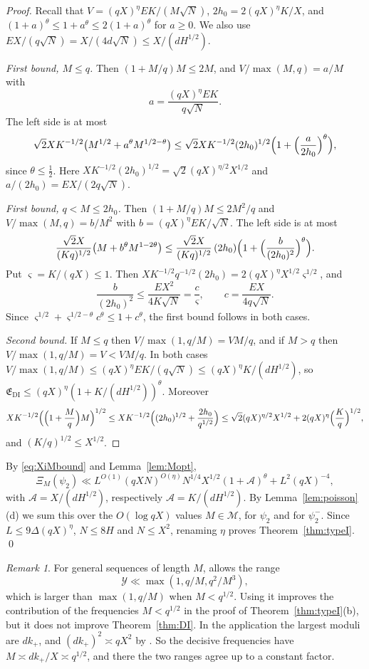 \documentclass[11pt]{amsart}
\theoremstyle{remark}
\newtheorem{remark}[theorem]{Remark}
\theoremstyle{definition}
\numberwithin{equation}{section}
\newcommand{\Mset}{\mathcal{M}}
\begin{document}
\begin{proof}
Recall that $V=(qX)^\eta EK/(M\sqrt N)$, $2h_0=2(qX)^\eta K/X$, and $(1+a)^\theta\le1+a^\theta\le2(1+a)^\theta$ for $a\ge0$. We also use $EX/(q\sqrt N)=X/(4d\sqrt N)\le X/(dH^{1/2})$.

\emph{First bound, $M\le q$.} Then $(1+M/q)M\le2M$, and $V/\max(M,q)=a/M$ with
\[
a=\frac{(qX)^\eta EK}{q\sqrt N}.
\]
The left side is at most
\[
\sqrt2XK^{-1/2}\bigl(M^{1/2}+a^\theta M^{1/2-\theta}\bigr)\le\sqrt2XK^{-1/2}(2h_0)^{1/2}\Bigl(1+\Bigl(\frac a{2h_0}\Bigr)^\theta\Bigr),
\]
since $\theta\le\frac12$. Here $XK^{-1/2}(2h_0)^{1/2}=\sqrt2(qX)^{\eta/2}X^{1/2}$ and $a/(2h_0)=EX/(2q\sqrt N)$.

\emph{First bound, $q<M\le2h_0$.} Then $(1+M/q)M\le2M^2/q$ and $V/\max(M,q)=b/M^2$ with $b=(qX)^\eta EK/\sqrt N$. The left side is at most
\[
\frac{\sqrt2X}{(Kq)^{1/2}}\bigl(M+b^\theta M^{1-2\theta}\bigr)\le\frac{\sqrt2X}{(Kq)^{1/2}}\,(2h_0)\Bigl(1+\Bigl(\frac b{(2h_0)^2}\Bigr)^\theta\Bigr).
\]
Put $\varsigma=K/(qX)\le1$. Then $XK^{-1/2}q^{-1/2}(2h_0)=2(qX)^\eta X^{1/2}\varsigma^{1/2}$, and
\[
\frac b{(2h_0)^2}\le\frac{EX^2}{4K\sqrt N}=\frac{c}{\varsigma},\qquad c=\frac{EX}{4q\sqrt N}.
\]
Since $\varsigma^{1/2}+\varsigma^{1/2-\theta}c^\theta\le1+c^\theta$, the first bound follows in both cases.

\emph{Second bound.} If $M\le q$ then $V/\max(1,q/M)=VM/q$, and if $M>q$ then $V/\max(1,q/M)=V<VM/q$. In both cases $V/\max(1,q/M)\le(qX)^\eta EK/(q\sqrt N)\le(qX)^\eta K/(dH^{1/2})$, so $\mathfrak E_{\mathrm{DI}}\le(qX)^{\eta}(1+K/(dH^{1/2}))^\theta$. Moreover
\[
XK^{-1/2}\Bigl(\Bigl(1+\frac Mq\Bigr)M\Bigr)^{1/2}\le XK^{-1/2}\Bigl((2h_0)^{1/2}+\frac{2h_0}{q^{1/2}}\Bigr)\le\sqrt2(qX)^{\eta/2}X^{1/2}+2(qX)^\eta\Bigl(\frac Kq\Bigr)^{1/2},
\]
and $(K/q)^{1/2}\le X^{1/2}$.
\end{proof}

By \eqref{eq:XiMbound} and Lemma~\ref{lem:Mopt},
\[
\Xi_M(\psi_2)\ll L^{O(1)}(qXN)^{O(\eta)}N^{1/4}X^{1/2}(1+\mathcal A)^\theta+L^2(qX)^{-4},
\]
with $\mathcal A=X/(dH^{1/2})$, respectively $\mathcal A=K/(dH^{1/2})$. By Lemma~\ref{lem:poisson}(d) we sum this over the $O(\log qX)$ values $M\in\Mset$, for $\psi_2$ and for $\psi_2^-$. Since $L\le9\Delta(qX)^\eta$, $N\le8H$ and $N\le X^2$, renaming $\eta$ proves Theorem~\ref{thm:typeI}. \qed

\begin{remark}\label{rem:q2N3}
For general sequences of length $M$, \cite[Theorem~A]{Pas} allows the range
\[
\mathcal Y\ll\max(1,q/M,q^2/M^3),
\]
which is larger than $\max(1,q/M)$ when $M<q^{1/2}$. Using it improves the contribution of the frequencies $M<q^{1/2}$ in the proof of Theorem~\ref{thm:typeI}(b), but it does not improve Theorem~\ref{thm:DI}. In the application the largest moduli are $dk_+$, and $(dk_+)^2\asymp qX^2$ by \cite[(7.2)]{II}. So the decisive frequencies have $M\asymp dk_+/X\asymp q^{1/2}$, and there the two ranges agree up to a constant factor.
\end{remark}
\end{document}
